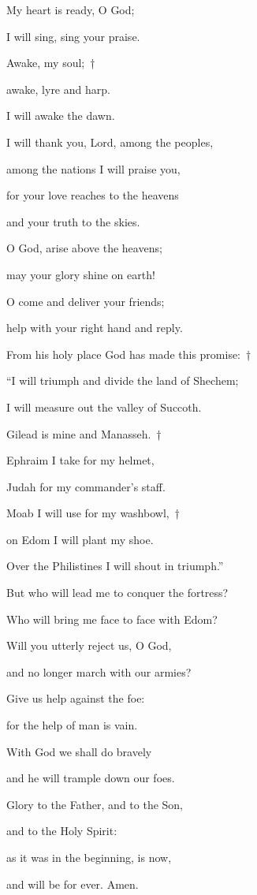 \noindent My heart is ready, O God;~\GreStar{}~\nopagebreak

I will sing, sing your praise.

\noindent Awake, my soul;~†~\nopagebreak

awake, lyre and harp.~\GreStar{}~\nopagebreak

I will awake the dawn.

\noindent I will thank you, Lord, among the peoples,~\GreStar{}~\nopagebreak

among the nations I will praise you,

\noindent for your love reaches to the heavens~\GreStar{}~\nopagebreak

and your truth to the skies.

\noindent O God, arise above the heavens;~\GreStar{}~\nopagebreak

may your glory shine on earth!

\noindent O come and deliver your friends;~\GreStar{}~\nopagebreak

help with your right hand and reply.

\noindent From his holy place God has made this promise:~†~\nopagebreak

“I will triumph and divide the land of Shechem;~\GreStar{}~\nopagebreak

I will measure out the valley of Succoth.

\noindent Gilead is mine and Manasseh.~†~\nopagebreak

Ephraim I take for my helmet,~\GreStar{}~\nopagebreak

Judah for my commander’s staff.~\GreStar{}~\nopagebreak

\noindent Moab I will use for my washbowl,~†~\nopagebreak

on Edom I will plant my shoe.~\GreStar{}~\nopagebreak

Over the Philistines I will shout in triumph.”

\noindent But who will lead me to conquer the fortress?~\GreStar{}~\nopagebreak

Who will bring me face to face with Edom?

\noindent Will you utterly reject us, O God,~\GreStar{}~\nopagebreak

and no longer march with our armies?

\noindent Give us help against the foe:~\GreStar{}~\nopagebreak

for the help of man is vain.

\noindent With God we shall do bravely~\GreStar{}~\nopagebreak

and he will trample down our foes.

\noindent Glory to the Father, and to the Son,~\GreStar{}~\nopagebreak

and to the Holy Spirit:

\noindent as it was in the beginning, is now,~\GreStar{}~\nopagebreak

and will be for ever. Amen.
